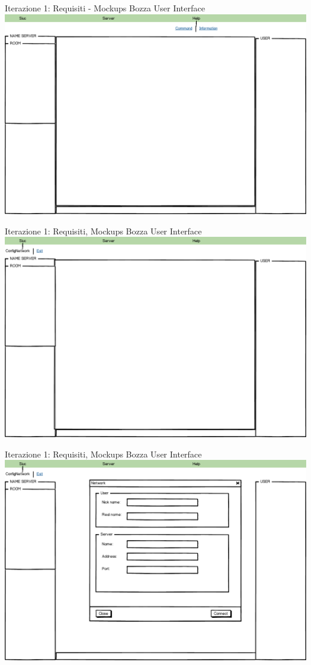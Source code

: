 \documentclass[t]{beamer} %
\begin{document}
\begin{frame} {Iterazione 1: Requisiti  - Mockups Bozza User Interface}
    \includegraphics[scale=0.29]{image_mockups/03_snuc_menu_help.png}{\centering}
\end{frame}

\begin{frame} {Iterazione 1: Requisiti, Mockups Bozza User Interface}
    \includegraphics[scale=0.29]{image_mockups/04_snuc_menu_snuc.png}{\centering}
\end{frame}

\begin{frame} {Iterazione 1: Requisiti, Mockups Bozza User Interface}
    \includegraphics[scale=0.29]{image_mockups/05_snuc_config_network.png}{\centering}
\end{frame}
\end{document}
